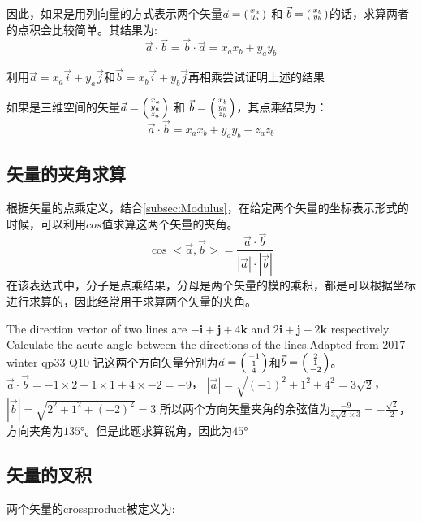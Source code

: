 因此，如果是用列向量的方式表示两个矢量$\vec{a}=\left(\begin{smallmatrix}x_a\\y_a\end{smallmatrix}\right)$ 和 $\vec{b}=\left(\begin{smallmatrix}x_b\\y_b\end{smallmatrix}\right)$的话，求算两者的点积会比较简单。其结果为:
\[
	\vec{a}\cdot \vec{b} =\vec{b}\cdot \vec{a} =x_a x_b+y_ay_b
\]

\begin{TaskBox}
利用$\vec{a}=x_a \vec{i}+y_a \vec{j}$和$\vec{b}=x_b \vec{i}+y_b \vec{j}$再相乘尝试证明上述的结果
\end{TaskBox}

如果是三维空间的矢量$\vec{a}=\left(\begin{smallmatrix}x_a\\y_a\\z_a\end{smallmatrix}\right)$ 和 $\vec{b}=\left(\begin{smallmatrix}x_b\\y_b\\z_b\end{smallmatrix}\right)$，其点乘结果为：
\[
	\vec{a}\cdot \vec{b} = x_ax_b+y_ay_b+z_az_b
\]

\subsection*{矢量的夹角求算}
根据矢量的点乘定义，结合\ref{subsec:Modulus}，在给定两个矢量的坐标表示形式的时候，可以利用$cos$值求算这两个矢量的夹角。
\[
	\cos <\vec{a},\vec{b}>=\frac{\vec{a}\cdot\vec{b}}{|\vec{a}|\cdot|\vec{b}|}
\]
在该表达式中，分子是点乘结果，分母是两个矢量的模的乘积，都是可以根据坐标进行求算的，因此经常用于求算两个矢量的夹角。

\begin{ExampleBox}
The direction vector of two lines are $-\mathbf{i}+\mathbf{j}+4\mathbf{k}$ and $2\mathbf{i}+\mathbf{j}-2\mathbf{k}$ respectively. Calculate the acute angle between the directions of the lines.\makebox{}\hfill Adapted from 2017 winter qp33 Q10
\tcblower
记这两个方向矢量分别为$\vec{a}=\left(\begin{smallmatrix}-1\\1\\4\end{smallmatrix}\right)$和$\vec{b}=\left(\begin{smallmatrix}2\\1\\-2\end{smallmatrix}\right)$。
$\vec{a}\cdot \vec{b}=-1\times2+1\times1+4\times -2=-9$， $|\vec{a}|=\sqrt{(-1)^2+1^2+4^2}=3\sqrt 2$，$|\vec{b}|=\sqrt{2^2+1^2+(-2)^2}=3$
所以两个方向矢量夹角的余弦值为$\frac{-9}{3\sqrt{2}\times 3}=-\frac{\sqrt2}{2}$，方向夹角为$135$\si{\degree}。但是此题求算锐角，因此为$45$\si{\degree}
\end{ExampleBox}
\clearpage


\subsection*{矢量的叉积}
\label{subsec:Cross Product}
两个矢量的\gls{crossproduct}被定义为:

